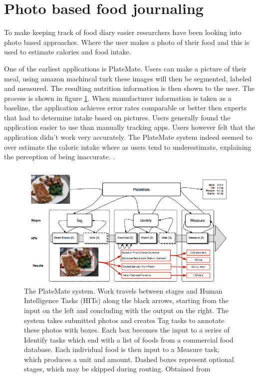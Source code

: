 \documentclass[a4paper]{scrartcl}
\begin{document}
\section{Photo based food journaling}
To make keeping track of food diary easier researchers have been looking into photo based approaches. Where the user makes a photo of their food and this is used to estimate calories and food intake. 

One of the earliest applications is PlateMate\cite{noronha2011platemate}. Users can make a picture of their meal, using amazon machincal turk these images will then be segmented, labeled and measured. The resulting nutrition information is then shown to the user. The process is shown in figure \ref{fig:PlateMate}. When manufacturer information is taken as a baseline, the application achieves error rates comparable or better then experts that had to determine intake based on pictures. Users generally found the application easier to use than manually tracking apps. Users however felt that the application didn't work very accurately. The PlateMate system indeed seemed to over estimate the caloric intake where as users tend to underestimate, explaining the perception of being inaccurate.  \cite{schoeller1990inaccuracies}. 
\begin{figure}[h!]

\centering
\includegraphics[scale=.4]{platemate.png}
\caption{\small{The PlateMate system. Work travels between stages and Human Intelligence Tasks (HITs) along the black
arrows, starting from the input on the left and concluding with the output on the right. The system takes submitted photos
and creates Tag tasks to annotate these photos with boxes. Each box becomes the input to a series of Identify tasks
which end with a list of foods from a commercial food database. Each individual food is then input to a Measure task,
which produces a unit and amount. Dashed boxes represent optional stages, which may be skipped during routing. Obtained from \cite{noronha2011platemate} } }
\label{fig:PlateMate}
\end{figure}
\end{document}
